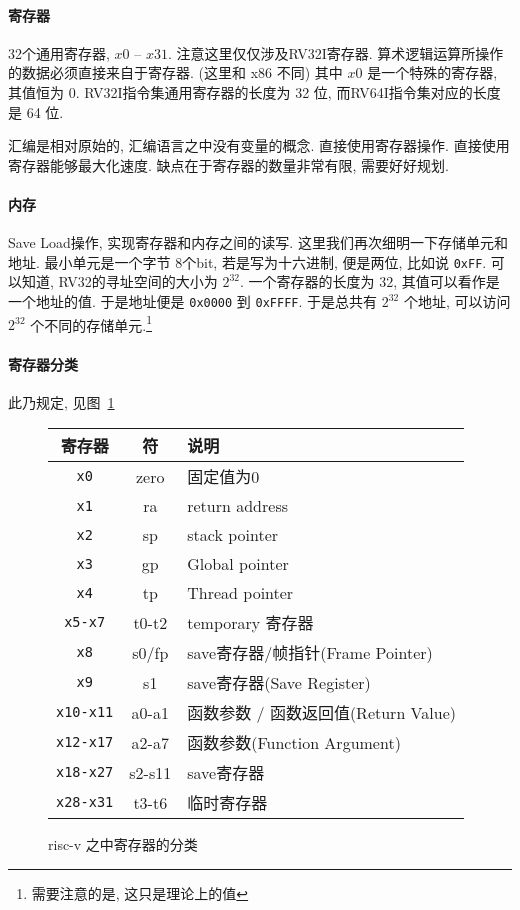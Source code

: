 \documentclass[12pt]{ctexart}
\theoremstyle{definition}
\theoremstyle{definition}
\theoremstyle{plain}
\begin{document}
\paragraph{寄存器}
32个通用寄存器, \(x0\) -- \(x31\). 注意这里仅仅涉及RV32I寄存器. 
算术逻辑运算所操作的数据必须直接来自于寄存器. (这里和 x86 不同) 
其中 \(x0\) 是一个特殊的寄存器, 其值恒为 \(0\). 
RV32I指令集通用寄存器的长度为 32 位, 而RV64I指令集对应的长度是 64 位. 

汇编是相对原始的, 汇编语言之中没有变量的概念. 直接使用寄存器操作. 
直接使用寄存器能够最大化速度. 
缺点在于寄存器的数量非常有限, 需要好好规划. 

\paragraph{内存}
Save Load操作, 实现寄存器和内存之间的读写. 这里我们再次细明一下存储单元和地址. 
最小单元是一个字节 8个bit, 若是写为十六进制, 便是两位, 比如说 \texttt{0xFF}.
可以知道, RV32的寻址空间的大小为 \(2 ^{32}\). 一个寄存器的长度为 \(32\), 其值可以看作是一个地址的值. 
于是地址便是 \texttt{0x0000} 到 \texttt{0xFFFF}. 于是总共有 \(2 ^{32}\) 个地址, 可以访问 \(2 ^{32} \) 个不同的存储单元.\footnote{需要注意的是, 这只是理论上的值} 

\paragraph{寄存器分类}
此乃规定, 见图~\ref{tab:fenlei}
\begin{figure}
		\centering 
		\begin{tabular}{|c|c|l|}
		\hline 
		寄存器 & 符 & 说明 \\ \hline
		\texttt{x0} & zero & 固定值为0 \\ \hline 
		\texttt{x1} & ra & return address \\ \hline 
		\texttt{x2} & sp & stack pointer \\ \hline 
		\texttt{x3} & gp & Global pointer \\ \hline 
		\texttt{x4} & tp & Thread pointer \\ \hline 
		\texttt{x5-x7} & t0-t2 & temporary 寄存器 \\ \hline 
		\texttt{x8} & s0/fp & save寄存器/帧指针(Frame Pointer) \\ \hline 
		\texttt{x9} & s1 & save寄存器(Save Register) \\ \hline 
		\texttt{x10-x11} &  		a0-a1 & 函数参数 / 函数返回值(Return Value) \\ \hline 
		\texttt{x12-x17} & a2-a7 & 函数参数(Function Argument) \\ \hline 
		\texttt{x18-x27} & s2-s11 & save寄存器 \\ \hline 
		\texttt{x28-x31} & t3-t6 & 临时寄存器  \\ \hline
		\end{tabular}
		\caption{risc-v 之中寄存器的分类}\label{tab:fenlei}
\end{figure}
\end{document}
